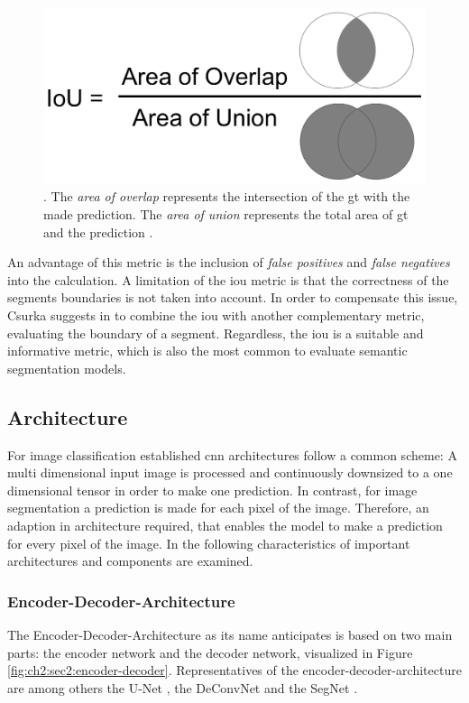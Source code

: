 \begin{figure}
	\includegraphics[scale=0.5]{figures/chap222_iou.png}
	\caption[Intersection over Union]{
		. The \textit{area of overlap} represents the intersection of the \gls{gt} with the made prediction. 
		The \textit{area of union} represents the total area of \gls{gt} and the prediction \cite{Sha18-DLCV}.}
	\label{fig:ch2:sec2:iou}
\end{figure}

An advantage of this metric is the inclusion of \textit{false positives} and \textit{false negatives} into the calculation.
A limitation of the \gls{iou} metric is that the correctness of the segments boundaries is not taken into account. 
In order to compensate this issue, Csurka suggests in \cite{Csu13-EvalMetric} to combine the \gls{iou} with another complementary metric, evaluating the boundary of a segment.
Regardless, the \gls{iou} is a suitable and informative metric, which is also the most common to evaluate semantic segmentation models.



\subsection{Architecture}\label{ord:ch2:sec2:subsec3}
For image classification established \gls{cnn} architectures follow a common scheme: 
A multi dimensional input image is processed and continuously downsized to a one dimensional tensor in order to make one prediction.
In contrast, for image segmentation a prediction is made for each pixel of the image.
Therefore, an adaption in architecture required, that enables the model to make a prediction for every pixel of the image.
In the following characteristics of important architectures and components are examined.

\subsubsection{Encoder-Decoder-Architecture}
The Encoder-Decoder-Architecture as its name anticipates is based on two main parts: the encoder network and the decoder network, visualized in Figure \ref{fig:ch2:sec2:encoder-decoder}. 
Representatives of the encoder-decoder-architecture are among others the U-Net \cite{RF15-U-Net}, the DeConvNet \cite{NHH15-DeConvNet} and the SegNet \cite{Bad17-SegNet}.

